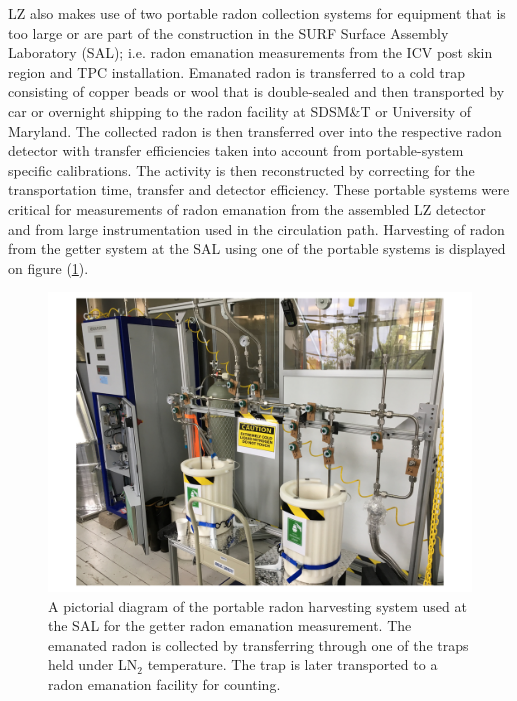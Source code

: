 LZ also makes use of two portable radon collection systems for equipment that is too large or are part of the construction in the SURF Surface Assembly Laboratory (SAL); i.e. radon emanation measurements from the ICV post skin region and TPC installation. Emanated radon is transferred to a cold trap consisting of copper beads or wool that is double-sealed and then transported by car or overnight shipping to the radon facility at SDSM\&T or University of Maryland. The collected radon is then transferred over into the respective radon detector with transfer efficiencies taken into account from portable-system specific calibrations. The activity is then reconstructed by correcting for the transportation time, transfer and detector efficiency. These portable systems were critical for measurements of radon emanation from the assembled LZ detector and from large instrumentation used in the circulation path. Harvesting of radon from the getter system at the SAL using one of the portable systems is displayed on figure (\ref{fig:portable_radon_harvesting_system}).
%
\begin{figure}[b]
    \centering
    \includegraphics[scale=0.45]{Chapter_4/Figures/portable_system_operation.pdf}
    \caption[A pictorial diagram of the portable radon harvesting system used at the SAL for the getter radon emanation measurement. The emanated radon is collected by transferring through one of the traps held under LN$_{2}$ temperature. The trap is later transported to a radon emanation facility for counting.]
    {A pictorial diagram of the portable radon harvesting system used at the SAL for the getter radon emanation measurement. The emanated radon is collected by transferring through one of the traps held under LN$_{2}$ temperature. The trap is later transported to a radon emanation facility for counting.}
    \label{fig:portable_radon_harvesting_system}
\end{figure}
%


